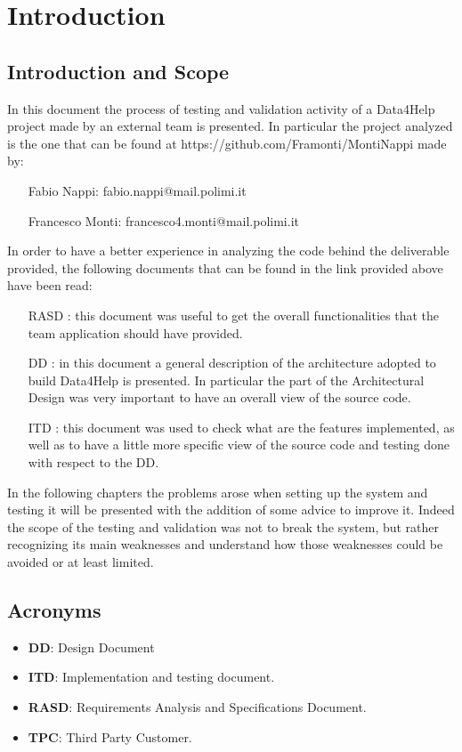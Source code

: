 \section{Introduction}

\subsection{Introduction and Scope}

In this document the process of testing and validation activity of a Data4Help project made by an external team is presented.
In particular the project analyzed is the one that can be found at
https://github.com/Framonti/MontiNappi made by:

\begin{itemize}
\item[] Fabio Nappi: fabio.nappi@mail.polimi.it
\item[] Francesco Monti: francesco4.monti@mail.polimi.it
\end{itemize}
In order to have a better experience in analyzing the code behind the deliverable provided, the following documents that can be found in the link provided above have been read:
\begin{itemize}
\item[RASD]: this document was useful to get the overall functionalities that the team application should have provided.
\item[DD]: in this document a general description of the architecture adopted to build Data4Help is presented. In particular the part of the Architectural Design was very important to have an overall view of the source code.
\item[ITD]: this document was used to check what are the features implemented, as well as to have a little more specific view of the source code and testing done with respect to the DD.
\end{itemize}


In the following chapters the problems arose when setting up the system and testing it will be presented with the addition of some advice to improve it. 
Indeed the scope of the testing and validation was not to break the system, but rather recognizing its main weaknesses and understand how those weaknesses could be avoided or at least limited. 


\subsection{Acronyms}
\begin{itemize}
\item \textbf{DD}: Design Document
\item \textbf{ITD}: Implementation and testing document.
\item \textbf{RASD}: Requirements Analysis and Specifications Document.
\item \textbf{TPC}: Third Party Customer.
\end{itemize}



